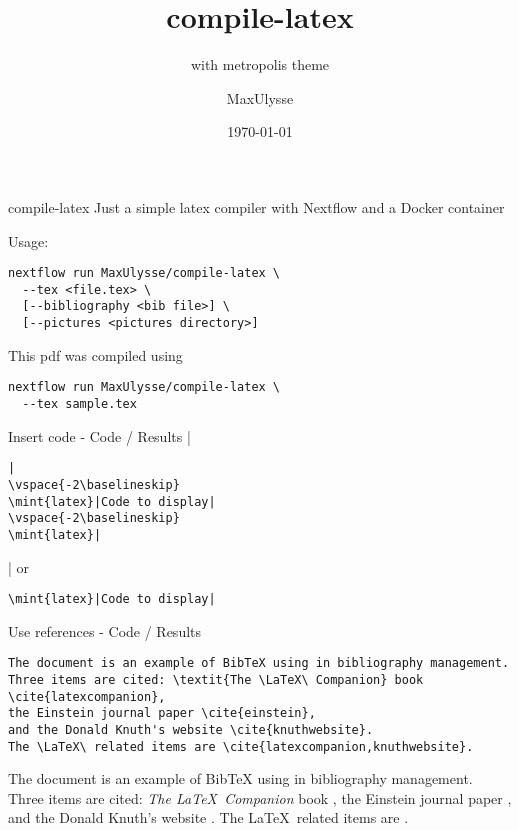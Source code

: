 \documentclass{beamer}
\author{MaxUlysse}
\title{compile-latex}
\subtitle{with metropolis theme}
\institute{
  SciLifeLab - Karolinska Institutet\\
  \vfill
  \texttt{[image: pictures/SciLifeLab]}
  \hfill
  \texttt{[image: pictures/KI]}
  \vfill
}
\date{\today}
\begin{document}
\maketitle

\begin{frame}[fragile]{compile-latex}
  Just a simple latex compiler with Nextflow and a Docker container

  Usage:
  \begin{verbatim}
nextflow run MaxUlysse/compile-latex \
  --tex <file.tex> \
  [--bibliography <bib file>] \
  [--pictures <pictures directory>]
  \end{verbatim}
  This pdf was compiled using
  \begin{verbatim}
nextflow run MaxUlysse/compile-latex \
  --tex sample.tex
  \end{verbatim}
\end{frame}

\begin{frame}[fragile]{Insert code - Code / Results}
\tiny
\mint{latex}|\begin{verbatim}|
\vspace{-2\baselineskip}
\mint{latex}|Code to display|
\vspace{-2\baselineskip}
\mint{latex}|\end{verbatim}|
or
\begin{verbatim}
\mint{latex}|Code to display|
\end{verbatim}
\end{frame}

\begin{frame}[fragile]{Use references - Code / Results}
\begin{verbatim}
The document is an example of BibTeX using in bibliography management.
Three items are cited: \textit{The \LaTeX\ Companion} book \cite{latexcompanion},
the Einstein journal paper \cite{einstein},
and the Donald Knuth's website \cite{knuthwebsite}.
The \LaTeX\ related items are \cite{latexcompanion,knuthwebsite}.
\end{verbatim}
The document is an example of BibTeX using in bibliography management.
Three items are cited: \textit{The \LaTeX\ Companion} book \cite{latexcompanion},
the Einstein journal paper \cite{einstein},
and the Donald Knuth's website \cite{knuthwebsite}.
The \LaTeX\ related items are \cite{latexcompanion,knuthwebsite}.
\end{frame}
\end{document}

